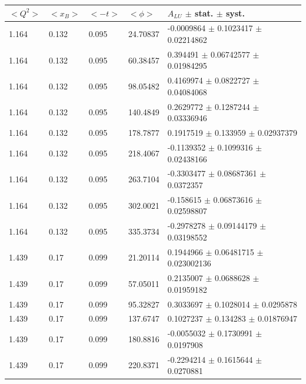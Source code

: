 \begin{table}[!h]
   \begin{center}
      \begin{tabular}{||l|l|l|l|l||}
         \hline
 $<Q^{2}>$ & $<x_{B}>$ & $<-t>$ & $<\phi>$ & $A_{LU}$ $\pm$ stat. $\pm$ syst.\\ 
         \hline
        1.164 & 0.132 & 0.095 &   24.70837  &    -0.0009864  $\pm$   0.1023417     $\pm$   0.02214862    \\
        1.164 & 0.132 & 0.095 &   60.38457  &     0.394491   $\pm$   0.06742577    $\pm$   0.01984295    \\
        1.164 & 0.132 & 0.095 &   98.05482  &     0.4169974  $\pm$   0.0822727     $\pm$   0.04084068    \\
        1.164 & 0.132 & 0.095 &   140.4849  &     0.2629772  $\pm$   0.1287244     $\pm$   0.03336946    \\
        1.164 & 0.132 & 0.095 &   178.7877  &     0.1917519  $\pm$   0.133959      $\pm$   0.02937379    \\
        1.164 & 0.132 & 0.095 &   218.4067  &    -0.1139352  $\pm$   0.1099316     $\pm$   0.02438166    \\
        1.164 & 0.132 & 0.095 &   263.7104  &    -0.3303477  $\pm$   0.08687361    $\pm$   0.0372357     \\
        1.164 & 0.132 & 0.095 &   302.0021  &    -0.158615   $\pm$   0.06873616    $\pm$   0.02598807    \\
        1.164 & 0.132 & 0.095 &   335.3734  &    -0.2978278  $\pm$   0.09144179    $\pm$   0.03198552    \\
         \hline                                                                         
        1.439 & 0.17 & 0.099 &    21.20114   &    0.1944966  $\pm$   0.06481715    $\pm$   0.023002136   \\
        1.439 & 0.17 & 0.099 &    57.05011   &    0.2135007  $\pm$   0.0688628     $\pm$   0.01959182    \\
        1.439 & 0.17 & 0.099 &    95.32827   &    0.3033697  $\pm$   0.1028014     $\pm$   0.0295878     \\
        1.439 & 0.17 & 0.099 &    137.6747   &    0.1027237  $\pm$   0.134283      $\pm$   0.01876947    \\
        1.439 & 0.17 & 0.099 &    180.8816   &   -0.0055032  $\pm$   0.1730991     $\pm$   0.0197908     \\
        1.439 & 0.17 & 0.099 &    220.8371   &   -0.2294214  $\pm$   0.1615644     $\pm$   0.0270881     \\

\end{tabular}
\end{center}
\end{table}
